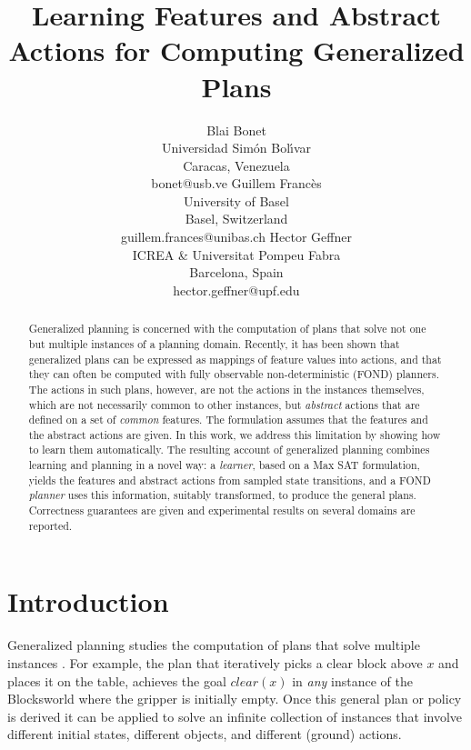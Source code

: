 \documentclass[letterpaper]{article} %
\title{Learning Features and Abstract Actions for Computing Generalized Plans}
\author{%
Blai Bonet\\ Universidad Sim\'on Bol\'{\i}var \\ Caracas, Venezuela \\ bonet@usb.ve
\And Guillem Franc\`{e}s \\ University of Basel \\ Basel, Switzerland \\ guillem.frances@unibas.ch
\And Hector Geffner \\ ICREA \& Universitat Pompeu Fabra \\ Barcelona, Spain \\ hector.geffner@upf.edu
}
\begin{document}
\maketitle

\begin{abstract}
  Generalized planning is concerned with the computation of plans that solve not one but  multiple instances
  of a planning domain. Recently, it has been shown that generalized plans can be expressed as mappings of feature
  values into actions, and that they can often be computed with fully observable non-deterministic
  (FOND) planners. %
  The actions in such plans, however, are not the actions in the instances themselves, which are
  not necessarily common to  other instances, but \emph{abstract} actions that are defined on a set 
  of \emph{common} features. The formulation assumes that the features and the abstract
  actions are given.
  In this work, we address this limitation by showing how to learn them automatically. 
  The resulting account of generalized planning combines learning and planning
  in a novel way: a \emph{learner}, based on a Max SAT formulation, yields the features and abstract
  actions from sampled state transitions, and a FOND \emph{planner}
  uses this information, suitably transformed, to produce the general plans.
  Correctness guarantees are given and experimental results on several domains are reported.
\end{abstract}


\section{Introduction}

Generalized planning studies the computation of plans  that   solve   multiple  instances
\cite{srivastava08learning,bonet:icaps2009,hu:generalized,BelleL16,anders:generalized}.
For example, the plan  that iteratively  picks  a  clear block above $x$ 
and places it  on the table, achieves the goal $clear(x)$
in \emph{any} instance of the Blocksworld where the gripper is initially empty.
Once this  general plan or  policy is derived it can be  applied to solve an infinite collection
of instances that involve different initial states, different objects, and  different (ground)  actions. 
\end{document}
